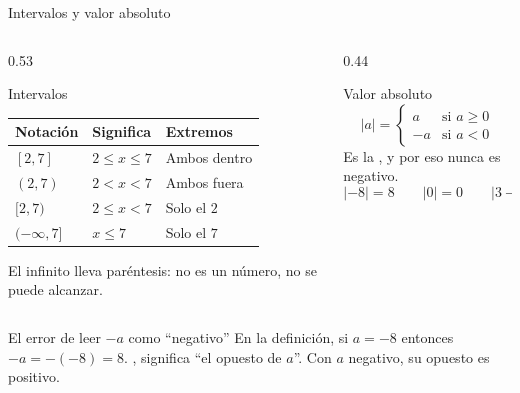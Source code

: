 \documentclass[aspectratio=169,10pt]{beamer}
\begin{document}
\begin{frame}{Intervalos y valor absoluto}
  \scriptsize
  \begin{columns}[T,onlytextwidth]
    \begin{column}{0.53\textwidth}
      \begin{block}{Intervalos}
        \tiny
        \begin{center}
        \begin{tabular}{@{}llp{2.2cm}@{}}
          \toprule
          \textbf{Notación} & \textbf{Significa} & \textbf{Extremos} \\
          \midrule
          $[2,7]$ & $2\le x\le 7$ & Ambos dentro \\
          $(2,7)$ & $2 < x < 7$ & Ambos fuera \\
          $[2,7)$ & $2\le x < 7$ & Solo el $2$ \\
          $(-\infty,7]$ & $x\le 7$ & Solo el $7$ \\
          \bottomrule
        \end{tabular}
        \end{center}
        \vspace{0.04cm}
        {\color{uniGris} El infinito  lleva paréntesis: no
        es un número, no se puede alcanzar.}
      \end{block}
    \end{column}
    \begin{column}{0.44\textwidth}
      \begin{block}{Valor absoluto}
        \tiny
        \[ |a| = \begin{cases} a & \text{si } a\ge 0 \\
                               -a & \text{si } a<0 \end{cases} \]
        Es la , y por eso nunca es negativo.
        \[ |-8| = 8 \qquad |0| = 0 \qquad |3-10| = 7 \]
      \end{block}
    \end{column}
  \end{columns}

  \vspace{0.08cm}
  \begin{alertblock}{El error de leer $-a$ como ``negativo''}
    \tiny
    En la definición, si $a=-8$ entonces $-a = -(-8) = 8$.
    , significa ``el
    opuesto de $a$''. Con $a$ negativo, su opuesto es positivo.
  \end{alertblock}
\end{frame}
\end{document}
